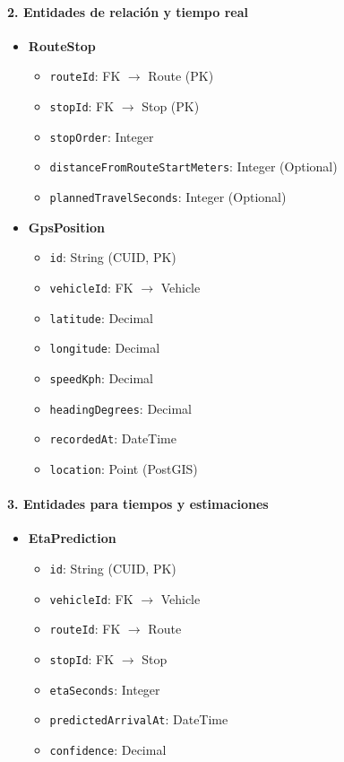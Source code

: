 \paragraph{2. Entidades de relación y tiempo real}
\begin{itemize}
    \item \textbf{RouteStop}
    \begin{itemize}
        \item \texttt{routeId}: FK $\rightarrow$ Route (PK)
        \item \texttt{stopId}: FK $\rightarrow$ Stop (PK)
        \item \texttt{stopOrder}: Integer
        \item \texttt{distanceFromRouteStartMeters}: Integer (Optional)
        \item \texttt{plannedTravelSeconds}: Integer (Optional)
    \end{itemize}
    \item \textbf{GpsPosition}
    \begin{itemize}
        \item \texttt{id}: String (CUID, PK)
        \item \texttt{vehicleId}: FK $\rightarrow$ Vehicle
        \item \texttt{latitude}: Decimal
        \item \texttt{longitude}: Decimal
        \item \texttt{speedKph}: Decimal
        \item \texttt{headingDegrees}: Decimal
        \item \texttt{recordedAt}: DateTime
        \item \texttt{location}: Point (PostGIS)
    \end{itemize}
\end{itemize}

\paragraph{3. Entidades para tiempos y estimaciones}
\begin{itemize}
    \item \textbf{EtaPrediction}
    \begin{itemize}
        \item \texttt{id}: String (CUID, PK)
        \item \texttt{vehicleId}: FK $\rightarrow$ Vehicle
        \item \texttt{routeId}: FK $\rightarrow$ Route
        \item \texttt{stopId}: FK $\rightarrow$ Stop
        \item \texttt{etaSeconds}: Integer
        \item \texttt{predictedArrivalAt}: DateTime
        \item \texttt{confidence}: Decimal
    \end{itemize}
\end{itemize}

